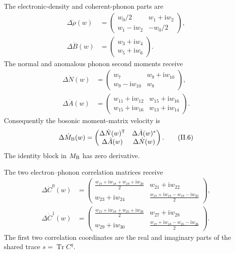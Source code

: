 \documentclass[10pt,letterpaper,twocolumn]{article}
\newcommand{\ii}{\mathrm i}
\begin{document}
The electronic-density and coherent-phonon parts are
\[
\begin{aligned}
\Delta\dot\rho(w)&=
\begin{pmatrix}
w_0/2&w_1+\ii w_2\\
w_1-\ii w_2&-w_0/2
\end{pmatrix},\\[2pt]
\Delta\dot B(w)&=
\begin{pmatrix}w_3+\ii w_4\\w_5+\ii w_6\end{pmatrix}.
\end{aligned}
\tag{II.4}
\]
The normal and anomalous phonon second moments receive
\[
\begin{aligned}
\Delta\dot N(w)&=
\begin{pmatrix}
w_7&w_9+\ii w_{10}\\
w_9-\ii w_{10}&w_8
\end{pmatrix},\\
\Delta\dot A(w)&=
\begin{pmatrix}
w_{11}+\ii w_{12}&w_{15}+\ii w_{16}\\
w_{15}+\ii w_{16}&w_{13}+\ii w_{14}
\end{pmatrix}.
\end{aligned}
\tag{II.5}
\]
Consequently the bosonic moment-matrix velocity is
\[
\Delta\dot M_{\rm B}(w)=
\begin{pmatrix}
\Delta\dot N(w)^{\mathsf T}&\Delta\dot A(w)^\ast\\
\Delta\dot A(w)&\Delta\dot N(w)
\end{pmatrix}.
\tag{II.6}
\]
The identity block in \(M_{\rm B}\) has zero derivative.

The two electron--phonon correlation matrices receive
{\scriptsize
\[
\begin{aligned}
\Delta\dot C^0(w)&=
\begin{pmatrix}
\frac{w_{17}+\ii w_{18}+w_{19}+\ii w_{20}}2&w_{21}+\ii w_{22}\\
w_{23}+\ii w_{24}&\frac{w_{17}+\ii w_{18}-w_{19}-\ii w_{20}}2
\end{pmatrix},\\[3pt]
\Delta\dot C^1(w)&=
\begin{pmatrix}
\frac{w_{17}+\ii w_{18}+w_{25}+\ii w_{26}}2&w_{27}+\ii w_{28}\\
w_{29}+\ii w_{30}&\frac{w_{17}+\ii w_{18}-w_{25}-\ii w_{26}}2
\end{pmatrix}.
\end{aligned}
\tag{II.7}
\]
}
The first two correlation coordinates are the real and imaginary parts of the
shared trace \(s=\operatorname{Tr}C^q\).
\end{document}

